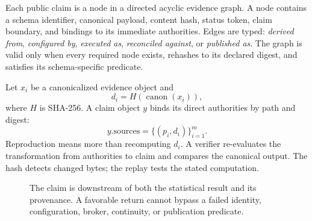 \documentclass[11pt]{article}
\newcommand{\evidence}{\textsc{evidence}}
\begin{document}
Each public claim is a node in a directed acyclic evidence graph. A node contains a schema identifier, canonical payload, content hash, status token, claim boundary, and bindings to its immediate authorities. Edges are typed: \emph{derived from}, \emph{configured by}, \emph{executed as}, \emph{reconciled against}, or \emph{published as}. The graph is valid only when every required node exists, rehashes to its declared digest, and satisfies its schema-specific predicate.

Let $x_i$ be a canonicalized evidence object and
\begin{equation}
  d_i = H(\operatorname{canon}(x_i)),
\end{equation}
where $H$ is SHA-256. A claim object $y$ binds its direct authorities by path and digest:
\begin{equation}
  y.\mathrm{sources} = \{(p_i,d_i)\}_{i=1}^{m}.
\end{equation}
Reproduction means more than recomputing $d_i$. A verifier re-evaluates the transformation from authorities to claim and compares the canonical output. The hash detects changed bytes; the replay tests the stated computation.

\begin{figure}[H]
\centering
{}
\caption{The claim is downstream of both the statistical result and its provenance. A favorable return cannot bypass a failed identity, configuration, broker, continuity, or publication predicate.}
\label{fig:architecture}
\end{figure}
\end{document}
